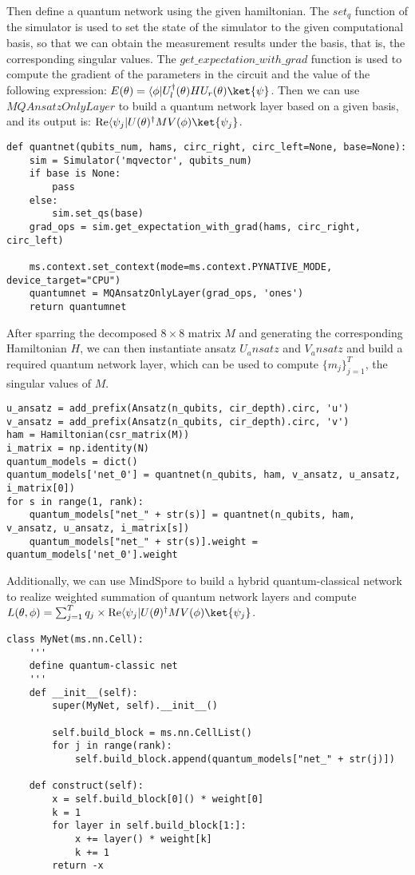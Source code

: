 Then define a quantum network using the given hamiltonian. The $set_q$ function of the simulator is used to set the state of the simulator to the given computational basis, so that we can obtain the measurement results under the basis, that is, the corresponding singular values. The $get\_expectation\_with\_grad$ function is used to compute the gradient of the parameters in the circuit and the value of the following expression: $E(\theta) = \langle\phi| U_l^{\dagger}(\theta) H U_r(\theta)\ket{\psi}$. Then we can use $MQAnsatzOnlyLayer$ to build a quantum network layer based on a given basis, and its output is: $\text{Re}\langle\psi_j|U(\theta)^{\dagger} M V(\phi)\ket{\psi_j}$. 
\begin{lstlisting}
def quantnet(qubits_num, hams, circ_right, circ_left=None, base=None):
    sim = Simulator('mqvector', qubits_num)
    if base is None:
        pass
    else:
        sim.set_qs(base)
    grad_ops = sim.get_expectation_with_grad(hams, circ_right, circ_left)

    ms.context.set_context(mode=ms.context.PYNATIVE_MODE, device_target="CPU")
    quantumnet = MQAnsatzOnlyLayer(grad_ops, 'ones')
    return quantumnet
\end{lstlisting}
After sparring the decomposed $8 \times 8$ matrix $M$ and generating the corresponding Hamiltonian $H$, we can then instantiate ansatz $U_ansatz$ and $V_ansatz$ and build a required quantum network layer, which can be used to compute $\{m_j\}_{j=1}^T$, the singular values of $M$. 
\begin{lstlisting}
u_ansatz = add_prefix(Ansatz(n_qubits, cir_depth).circ, 'u')
v_ansatz = add_prefix(Ansatz(n_qubits, cir_depth).circ, 'v')
ham = Hamiltonian(csr_matrix(M))
i_matrix = np.identity(N)
quantum_models = dict()
quantum_models['net_0'] = quantnet(n_qubits, ham, v_ansatz, u_ansatz, i_matrix[0])
for s in range(1, rank):
    quantum_models["net_" + str(s)] = quantnet(n_qubits, ham, v_ansatz, u_ansatz, i_matrix[s])
    quantum_models["net_" + str(s)].weight = quantum_models['net_0'].weight
\end{lstlisting}
Additionally, we can use MindSpore to build a hybrid quantum-classical network to realize weighted summation of quantum network layers and compute $L(\theta,\phi) = \sum_{j=1}^T q_j \times \text{Re} \langle\psi_j| U(\theta)^{\dagger} M V(\phi)\ket{\psi_j}$. 
\begin{lstlisting}
class MyNet(ms.nn.Cell):
    '''
    define quantum-classic net
    '''
    def __init__(self):
        super(MyNet, self).__init__()

        self.build_block = ms.nn.CellList()
        for j in range(rank):
            self.build_block.append(quantum_models["net_" + str(j)])

    def construct(self):
        x = self.build_block[0]() * weight[0]
        k = 1
        for layer in self.build_block[1:]:
            x += layer() * weight[k]
            k += 1
        return -x
\end{lstlisting}
